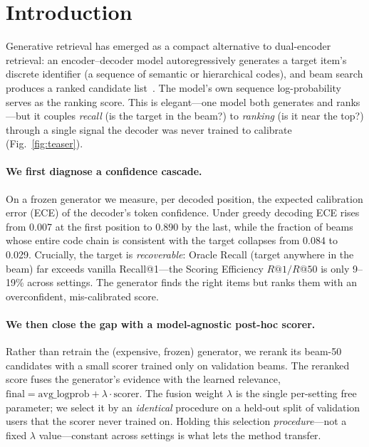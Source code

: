 \documentclass[sigconf,anonymous,review]{acmart}
\begin{document}
\section{Introduction}
Generative retrieval has emerged as a compact alternative to dual-encoder retrieval: an
encoder--decoder model autoregressively generates a target item's discrete identifier (a sequence of
semantic or hierarchical codes), and beam search produces a ranked candidate
list~\cite{tiger,gram,idgenrec,lcrec,letter}. The model's own sequence log-probability serves as the
ranking score. This is elegant---one model both generates and ranks---but it couples \emph{recall}
(is the target in the beam?) to \emph{ranking} (is it near the top?) through a single signal the
decoder was never trained to calibrate (Fig.~\ref{fig:teaser}).

\paragraph{We first diagnose a confidence cascade.} On a frozen generator we measure, per decoded
position, the expected calibration error (ECE) of the decoder's token confidence. Under greedy
decoding ECE rises from 0.007 at the first position to 0.890 by the last, while the fraction of beams
whose entire code chain is consistent with the target collapses from 0.084 to 0.029. Crucially, the
target is \emph{recoverable}: Oracle Recall (target anywhere in the beam) far exceeds vanilla
Recall@1---the Scoring Efficiency $R@1/R@50$ is only 9--19\% across settings. The generator finds the
right items but ranks them with an overconfident, mis-calibrated score.

\paragraph{We then close the gap with a model-agnostic post-hoc scorer.} Rather than retrain the
(expensive, frozen) generator, we rerank its beam-50 candidates with a small scorer trained only on
validation beams. The reranked score fuses the generator's evidence with the learned relevance,
$\mathrm{final}=\mathrm{avg\_logprob}+\lambda\cdot\mathrm{scorer}$. The fusion weight $\lambda$ is the
single per-setting free parameter; we select it by an \emph{identical} procedure on a held-out split
of validation users that the scorer never trained on. Holding this selection \emph{procedure}---not a
fixed $\lambda$ value---constant across settings is what lets the method transfer.
\end{document}
